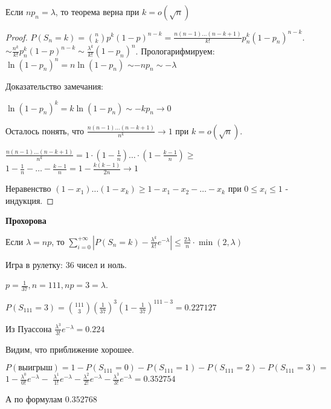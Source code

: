 \begin{remark}
    Если $n p_n = \lambda$, то теорема верна при $k = o(\sqrt{n})$
\end{remark}

\begin{proof}
    $P(S_n = k) = \binom{n}{k} p^k (1 - p)^{n - k} = \frac{n(n - 1)\ldots(n - k + 1)}{k!} p_n^k (1 - p_n)^{n - k}$.
    $\sim \frac{n^k}{k!} p_n^k (1 - p)^{n - k} \sim \frac{\lambda^k}{k!} (1 - p_n)^n$. Прологарифмируем: $\ln (1 - p_n)^n = n \ln (1 - p_n)$
    $\sim -n p_n \sim -\lambda$

    Доказательство замечания:

    $\ln (1 - p_n)^k = k \ln (1 - p_n) \sim -kp_n \rightarrow 0$

    Осталось понять, что $\frac{n(n - 1) \ldots (n - k + 1)}{n^k} \to 1$ при $k = o(\sqrt{n})$.

    $\frac{n(n - 1) \ldots (n - k + 1)}{n^k} = 1 \cdot (1 - \frac{1}{n}) \ldots \cdot (1 - \frac{k - 1}{n}) \geqslant$
    $1 - \frac{1}{n} - \ldots -  \frac{k - 1}{n} = 1 - \frac{k(k - 1)}{2n} \rightarrow 1$

    Неравенство $(1 - x_1) \ldots (1 - x_k) \geqslant 1 - x_1 - x_2 - \ldots - x_k$ при $0 \leqslant x_i \leqslant 1$ - индукция.
\end{proof}

\begin{theorem}
    \textbf{Прохорова}

    Если $\lambda = np$, то $\sum_{i = 0}^{+\infty} |P(S_n = k) - \frac{\lambda^k}{k!}e^{-\lambda}| \leqslant \frac{2\lambda}{n} \cdot \min(2, \lambda)$

\end{theorem}

\begin{example}
    Игра в рулетку: 36 чисел и ноль. 

    $p = \frac{1}{37}, n = 111, np = 3 = \lambda$.

    $P(S_{111} = 3) = \binom{111}{3} (\frac{1}{37})^3 (1 - \frac{1}{37})^{111 - 3} = 0.227127$

    Из Пуассона $\frac{\lambda^3}{3!} e^{-\lambda} = 0.224$

    Видим, что приближение хорошее.

    $P(\text{выигрыш}) = 1 - P(S_{111} = 0) - P(S_{111} = 1) - P(S_{111} = 2) - P(S_{111} = 3) = $
    $1 - \frac{\lambda^0}{0!}e^{-\lambda} -$
    $\frac{\lambda^1}{1!}e^{-\lambda} - \frac{\lambda^2}{2!}e^{-\lambda} - \frac{\lambda^3}{3!}e^{-\lambda} = 0.352754$
    
    А по формулам $0.352768$
\end{example}

